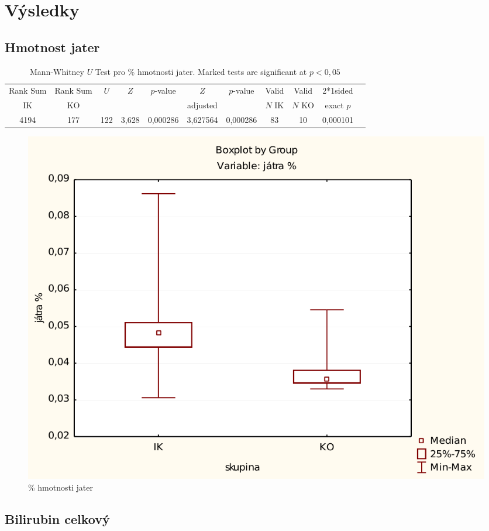 \documentclass[12pt]{article}
\begin{document}
\newpage

\section{Výsledky}
\subsection{Hmotnost jater}

\begin{table}[h]
\begin{tabular}{|c|c|c|c|c|c|c|c|c|c|c|}
\hline
Rank Sum & Rank Sum & $U$ & $Z$ & $p$-value & $Z$ & $p$-value & Valid & Valid & 2*1sided \\
IK & KO & & & & adjusted & & $N$ IK & $N$ KO & exact $p$ \\
\hline
4194 & 177 & 122 & 3,628 & 0,000286 & 3,627564 & 0,000286 & 83 & 10 & 0,000101 \\
\hline
\end{tabular}
\caption{Mann-Whitney $U$ Test pro \% hmotnosti jater. Marked tests are significant at $p < 0,05$}
\end{table}

\begin{figure}[ht!]
	\begin{centering}
	\includegraphics[width=\linewidth]{hmotnost-jatra.pdf}
	\caption{\% hmotnosti jater}
	\end{centering}
\end{figure}

\newpage

\subsection{Bilirubin celkový}
\end{document}
